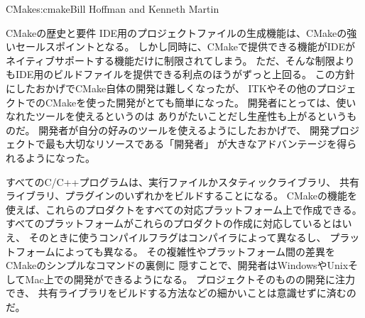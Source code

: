 \begin{aosachapter}{CMake}{s:cmake}{Bill Hoffman and Kenneth Martin}
\begin{aosasect1}{CMakeの歴史と要件}
IDE用のプロジェクトファイルの生成機能は、CMakeの強いセールスポイントとなる。
しかし同時に、CMakeで提供できる機能がIDEがネイティブサポートする機能だけに制限されてしまう。
ただ、そんな制限よりもIDE用のビルドファイルを提供できる利点のほうがずっと上回る。
この方針にしたおかげでCMake自体の開発は難しくなったが、
ITKやその他のプロジェクトでのCMakeを使った開発がとても簡単になった。
開発者にとっては、使いなれたツールを使えるというのは
ありがたいことだし生産性も上がるというものだ。
開発者が自分の好みのツールを使えるようにしたおかげで、
開発プロジェクトで最も大切なリソースである「開発者」
が大きなアドバンテージを得られるようになった。

すべてのC/C++プログラムは、実行ファイルかスタティックライブラリ、
共有ライブラリ、プラグインのいずれかをビルドすることになる。
CMakeの機能を使えば、これらのプロダクトをすべての対応プラットフォーム上で作成できる。
すべてのプラットフォームがこれらのプロダクトの作成に対応しているとはいえ、
そのときに使うコンパイルフラグはコンパイラによって異なるし、
プラットフォームによっても異なる。
その複雑性やプラットフォーム間の差異をCMakeのシンプルなコマンドの裏側に
隠すことで、開発者はWindowsやUnixそしてMac上での開発ができるようになる。
プロジェクトそのものの開発に注力でき、
共有ライブラリをビルドする方法などの細かいことは意識せずに済むのだ。


\end{aosasect1}
\end{aosachapter}
